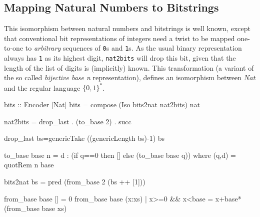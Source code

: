 \documentclass[]{INCLUDES/llncs}
\begin{document}
\newpage



 

\subsection*{Mapping Natural Numbers to Bitstrings} \label{bits}
This isomorphism between natural numbers and bitstrings is well known, except
that conventional bit representations
of integers need a twist to be mapped one-to-one to
{\em arbitrary} sequences of {\tt 0}s and {\tt 1}s.
As the usual binary representation always has
{\tt 1} as its highest digit, {\tt nat2bits}
will drop this bit, given
that the length of the list of digits is 
(implicitly) known. This transformation (a variant of the so called {\em
bijective base n} representation), defines an isomorphism between $Nat$ and
the regular language $\{0,1\}^*$.
\begin{code}
bits :: Encoder [Nat]
bits = compose (Iso bits2nat nat2bits) nat

nat2bits = drop_last . (to_base 2) . succ

drop_last bs=genericTake ((genericLength bs)-1) bs
    
to_base base n = d : 
  (if q==0 then [] else (to_base base q)) where
     (q,d) = quotRem n base
    
bits2nat bs = pred (from_base 2 (bs ++ [1]))

from_base base [] = 0
from_base base (x:xs) | x>=0 && x<base = 
   x+base*(from_base base xs)
\end{code}
\end{document}
